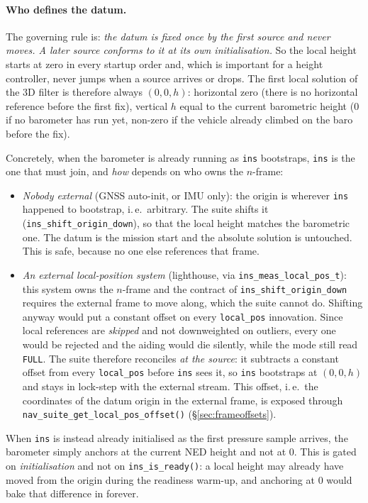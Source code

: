 \documentclass[11pt,a4paper]{article}
\newcommand{\code}[1]{\texttt{#1}}
\begin{document}
\paragraph{Who defines the datum.}
\label{sec:datumarb}
The governing rule is: \emph{the datum is fixed once by the first source
and never moves. A later source conforms to it at its own
initialisation.} So the local height starts at zero in every startup
order and, which is important for a height controller, never jumps when a
source arrives or drops. The first local solution of the 3D filter is
therefore always $(0, 0, h)$: horizontal zero (there is no horizontal
reference before the first fix), vertical $h$ equal to the current
barometric height ($0$ if no barometer has run yet, non-zero if the
vehicle already climbed on the baro before the fix).

Concretely, when the barometer is already running as \code{ins} bootstraps,
\code{ins} is the one that must join, and \emph{how} depends on who owns the
$n$-frame:
\begin{itemize}
\item \emph{Nobody external} (GNSS auto-init, or IMU only): the origin is
  wherever \code{ins} happened to bootstrap, i.\,e.\ arbitrary. The suite shifts
  it (\code{ins\_\allowbreak{}shift\_\allowbreak{}origin\_\allowbreak{}down}), so that the local height matches the
  barometric one. The datum is the mission start and the absolute solution is
  untouched. This is safe, because no one else references that frame.
\item \emph{An external local-position system} (lighthouse, via
  \code{ins\_\allowbreak{}meas\_\allowbreak{}local\_\allowbreak{}pos\_\allowbreak{}t}): this system owns the $n$-frame and the
  contract of \code{ins\_\allowbreak{}shift\_\allowbreak{}origin\_\allowbreak{}down} requires the external frame to move
  along, which the suite cannot do. Shifting anyway would put a constant offset
  on every \code{local\_\allowbreak{}pos} innovation. Since local references are
  \emph{skipped} and not downweighted on outliers, every one would be
  rejected and the aiding would die silently, while the mode still read
  \code{FULL}. The suite therefore reconciles \emph{at the source}: it subtracts
  a constant offset from every \code{local\_\allowbreak{}pos} before \code{ins} sees it, so
  \code{ins} bootstraps at $(0,0,h)$ and stays in lock-step with the external
  stream. This offset, i.\,e.\ the coordinates of the datum origin in the
  external frame, is exposed through
  \code{nav\_\allowbreak{}suite\_\allowbreak{}get\_\allowbreak{}local\_\allowbreak{}pos\_\allowbreak{}offset()}
  (\S\ref{sec:frameoffsets}).
\end{itemize}
When \code{ins} is instead already initialised as the first pressure
sample arrives, the barometer simply anchors at the current NED height
and not at $0$. This is gated on \emph{initialisation} and not on
\code{ins\_\allowbreak{}is\_\allowbreak{}ready()}: a local height may already have moved from the
origin during the readiness warm-up, and anchoring at $0$ would bake that
difference in forever.
\end{document}
